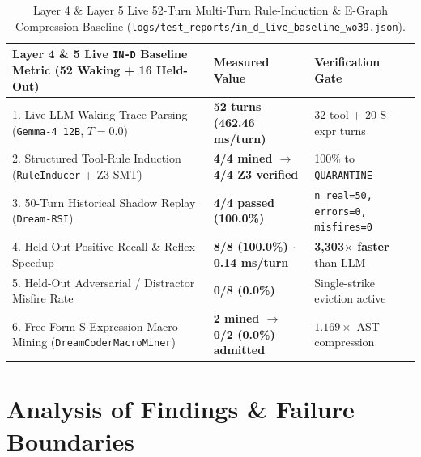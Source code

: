 \documentclass[11pt,a4paper]{article}
\begin{document}
\begin{table}[h!]
\centering
\small
\begin{tabular}{lll}
\toprule
\textbf{Layer 4 \& 5 Live \texttt{IN-D} Baseline Metric (52 Waking + 16 Held-Out)} & \textbf{Measured Value} & \textbf{Verification Gate} \\
\midrule
1. Live LLM Waking Trace Parsing (\texttt{Gemma-4 12B}, $T=0.0$) & \textbf{52 turns (462.46 ms/turn)} & 32 tool + 20 S-expr turns \\
2. Structured Tool-Rule Induction (\texttt{RuleInducer} + Z3 SMT) & \textbf{4/4 mined $\to$ 4/4 Z3 verified} & 100\% to \texttt{QUARANTINE} \\
3. 50-Turn Historical Shadow Replay (\texttt{Dream-RSI}) & \textbf{4/4 passed (100.0\%)} & \texttt{n\_real=50, errors=0, misfires=0} \\
4. Held-Out Positive Recall \& Reflex Speedup & \textbf{8/8 (100.0\%) $\cdot$ 0.14 ms/turn} & \textbf{3,303$\times$ faster} than LLM \\
5. Held-Out Adversarial / Distractor Misfire Rate & \textbf{0/8 (0.0\%)} & Single-strike eviction active \\
6. Free-Form S-Expression Macro Mining (\texttt{DreamCoderMacroMiner}) & \textbf{2 mined $\to$ 0/2 (0.0\%) admitted} & $1.169\times$ AST compression \\
\bottomrule
\end{tabular}
\caption{Layer 4 \& Layer 5 Live 52-Turn Multi-Turn Rule-Induction \& E-Graph Compression Baseline (\texttt{logs/test\_reports/in\_d\_live\_baseline\_wo39.json}).}
\end{table}

\section{Analysis of Findings \& Failure Boundaries}
\end{document}
